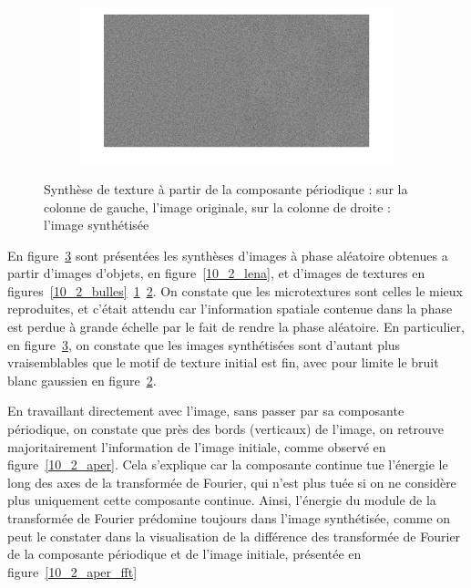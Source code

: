 \documentclass[12pt,a4paper,onecolumn]{article}
\begin{document}
\begin{figure}
\begin{subfigure}[b]{\textwidth}
		\label{10_2_tissu}
	\end{subfigure}
	\begin{subfigure}[b]{\textwidth}
		\centering
		\includegraphics[height = 0.20\textheight]{10_2_noise}
		\label{10_2_noise}
	\end{subfigure}
	\caption{Synthèse de texture à partir de la composante périodique : sur la colonne de gauche, l'image originale, sur la colonne de droite : l'image synthétisée}
	\label{10_2_textures}
\end{figure}

En figure~\ref{10_2_textures} sont présentées les synthèses d'images à phase aléatoire obtenues a partir d'images d'objets, en figure~\ref{10_2_lena}, et d'images de textures en figures~\ref{10_2_bulles}~\ref{10_2_tissu}~\ref{10_2_noise}. On constate que les microtextures sont celles le mieux reproduites, et c'était attendu car l'information spatiale contenue dans la phase est perdue à grande échelle par le fait de rendre la phase aléatoire. En particulier, en figure~\ref{10_2_textures}, on constate que les images synthétisées sont d'autant plus vraisemblables que le motif de texture initial est fin, avec pour limite le bruit blanc gaussien en figure~\ref{10_2_noise}.

En travaillant directement avec l'image, sans passer par sa composante périodique, on constate que près des bords (verticaux) de l'image, on retrouve majoritairement l'information de l'image initiale, comme observé en figure~\ref{10_2_aper}. Cela s'explique car la composante continue tue l'énergie le long des axes de la transformée de Fourier, qui n'est plus tuée si on ne considère plus uniquement cette composante continue. Ainsi, l'énergie du module de la transformée de Fourier prédomine toujours dans l'image synthétisée, comme on peut le constater dans la visualisation de la différence des transformée de Fourier de la composante périodique et de l'image initiale, présentée en figure~\ref{10_2_aper_fft}
\end{document}

